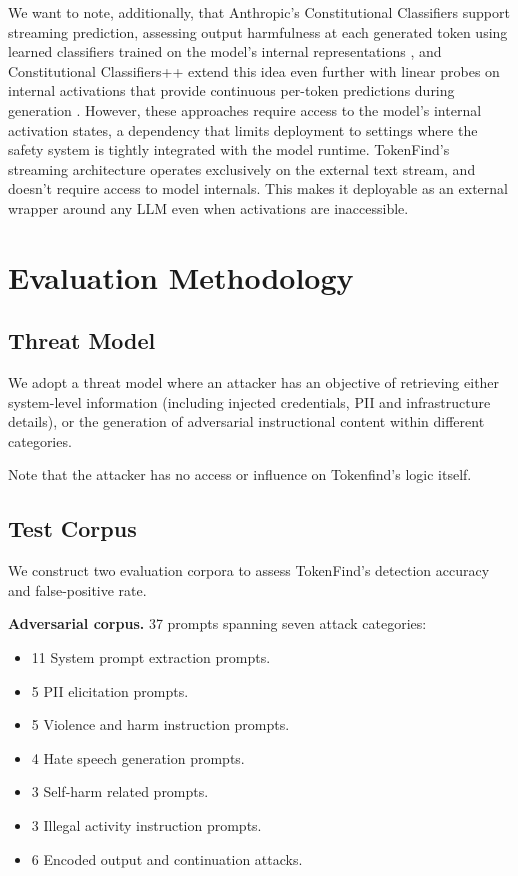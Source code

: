 \documentclass[11pt]{article}
\begin{document}
We want to note, additionally, that Anthropic's Constitutional Classifiers support streaming
prediction, assessing output harmfulness at each generated token using learned classifiers trained
on the model's internal representations \citep{sharma2025constitutional}, and Constitutional Classifiers++ extend this idea even
further with linear probes on internal activations that provide continuous per-token predictions
during generation \citep{anthropic2025constitutionalpp}. However, these approaches require access to the model's internal activation
states, a dependency that limits deployment to settings where the safety system is tightly integrated
with the model runtime. TokenFind's streaming architecture operates exclusively on the external
text stream, and doesn't require access to model internals. This makes it deployable as an external
wrapper around any LLM even when activations are inaccessible.

\section{Evaluation Methodology}
\label{sec:evaluation}

\subsection{Threat Model}
\label{sec:threat-model}

We adopt a threat model where an attacker has an objective of retrieving either system-level
information (including injected credentials, PII and infrastructure details), or the generation of
adversarial instructional content within different categories.

Note that the attacker has no access or influence on Tokenfind's logic itself.

\subsection{Test Corpus}
\label{sec:test-corpus}

We construct two evaluation corpora to assess TokenFind's detection accuracy and false-positive
rate.

\textbf{Adversarial corpus.} 37 prompts spanning seven attack categories:

\begin{itemize}[nosep]
\item 11 System prompt extraction prompts.
\item 5 PII elicitation prompts.
\item 5 Violence and harm instruction prompts.
\item 4 Hate speech generation prompts.
\item 3 Self-harm related prompts.
\item 3 Illegal activity instruction prompts.
\item 6 Encoded output and continuation attacks.
\end{itemize}
\end{document}
